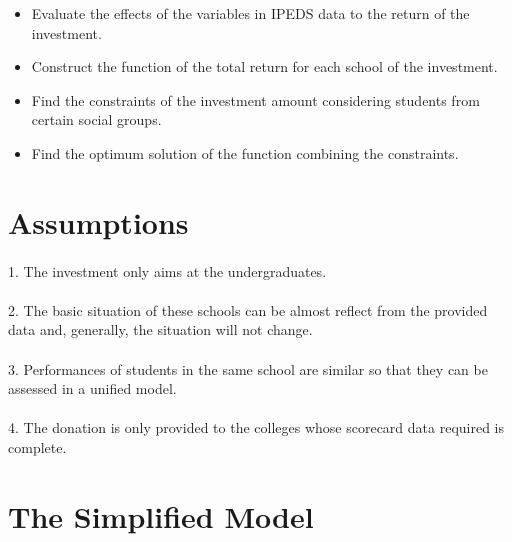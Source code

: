 \documentclass{mcmthesis}
\begin{document}
\begin{itemize}
\item Evaluate the effects of the variables in IPEDS data to the return of the investment.
\item Construct the function of the total return for each school of the investment.
\item Find the constraints of the investment amount considering students from certain social groups.
\item Find the optimum solution of the function combining the  constraints.
\end{itemize}



\section{Assumptions}
\paragraph{} 1. The investment only aims at the undergraduates.
\paragraph{} 2. The basic situation of these schools can be almost reflect from the provided data and, generally, the situation will not change.
\paragraph{} 3. Performances of students in the same school are similar so that they can be assessed in a unified model.
\paragraph{} 4. The donation is only provided to the colleges whose scorecard data required is complete. 


\section{The Simplified Model}
\end{document}
